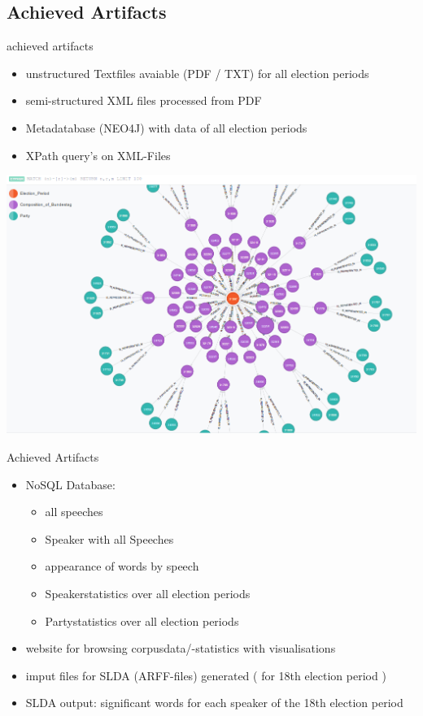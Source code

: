 \documentclass[11pt, a4paper]{beamer}
\begin{document}
\subsection{Achieved Artifacts}
\begin{frame}{achieved artifacts}
\begin{itemize}
\item unstructured Textfiles avaiable (PDF / TXT) for all election periods
\item semi-structured XML files processed from PDF
\item Metadatabase (NEO4J) with data of all election periods
\item XPath query's on XML-Files
\end{itemize}
\begin{center}
\includegraphics[scale=0.25]{metadatabase.png}
\end{center}
\end{frame}

\begin{frame}{Achieved Artifacts}
\begin{itemize}
\item NoSQL Database:
	\begin{itemize}
		\item all speeches
		\item Speaker with all Speeches
		\item appearance of words by speech
		\item Speakerstatistics over all election periods
		\item Partystatistics over all election periods
	\end{itemize}
\item website for browsing corpusdata/-statistics with visualisations
\item imput files for SLDA (ARFF-files) generated ( for 18th election period )
\item SLDA output: significant words for each speaker of the 18th election period
\end{itemize}
\end{frame}
\end{document}
